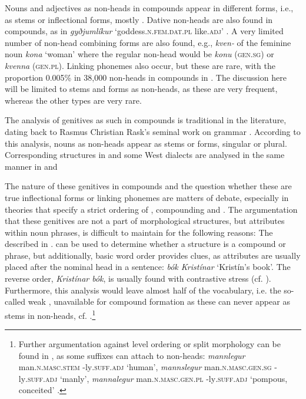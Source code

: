 \documentclass[output=paper]{LSP/langsci}
\begin{document}
Nouns and adjectives as non-heads in  compounds appear in different forms, i.e., as stems or inflectional forms, mostly . Dative non-heads are also found in compounds, as in \textit{gyðjumlíkur} ‘goddess\textsc{.n.fem.dat.pl} like\textsc{.adj}’ \citep{Bjarnadóttir2002}. A very limited number of non-head combining forms are also found, e.g., \textit{kven-} of the feminine noun \textit{kona} ‘woman’ where the regular non-head would be \textit{konu} (\textsc{gen.sg}) or \textit{kvenna} (\textsc{gen.pl}). Linking phonemes also occur, but these are rare,  with the proportion 0.005\% in 38,000 non-heads in compounds in \citealt{Bjarnadóttir19962005}. The discussion here will be limited to stems and  forms as non-heads, as these are very frequent, whereas the other types are very rare.

The analysis of genitives as such in  compounds is traditional in the   literature, dating back to Rasmus Christian Rask’s seminal work on  grammar \citet{Rask1811}. According to this analysis, nouns as non-heads appear as stems or  forms, singular or plural. Corresponding structures in  and some West  dialects are analysed in the same manner in  \citet{Indriðason2014} and \citet{ThráinssonEtAl2004}

The nature of these genitives in  compounds and the question whether these are true inflectional forms or linking phonemes are matters of debate, 
especially in theories that specify a strict ordering of , compounding and . The argumentation that these genitives are not a part of morphological structures, but attributes within noun phrases, is difficult to maintain for the following reasons: The  described in . can be used to determine whether a structure is a compound or phrase, but additionally, basic  word order provides clues, as  attributes are usually placed after the nominal head in a sentence: \textit{bók Kristínar} ‘Kristín’s book’. The reverse order,  \textit{Kristínar bók}, is usually found with contrastive stress (cf. \citealt[92--96]{Thráinsson2007}). Furthermore, this analysis would leave almost half of the vocabulary, i.e. the so-called weak , unavailable for compound formation as these can never appear as stems in non-heads, cf. .\footnote{Further argumentation against level ordering or split morphology can be found in  , as some suffixes can attach to  non-heads: \textit{mannlegur} man\textsc{.n.masc.stem} -ly\textsc{.suff.adj} `human', \textit{mannslegur} man\textsc{.n.masc.gen.sg} -ly\textsc{.suff.adj} `manly', \textit{mannalegur} man\textsc{.n.masc.gen.pl} -ly\textsc{.suff.adj} `pompous, conceited' \citep{Bjarnadóttir19962005,Indriðason1994}.  
}
\end{document}
